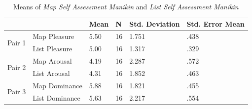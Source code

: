\begin{table}[hbtp!]
\centering
\caption{Means of \textit{Map Self Assessment Manikin} and \textit{List Self Assessment Manikin}} \vspace{0.3cm}
\label{res:sampre}
\begin{tabular}{|l|l|llll|}
\hline
\multicolumn{2}{|c|}{}  & Mean  & N  & Std. Deviation & Std. Error Mean \\ \hline\hline
\multirow{2}{*}{Pair 1} & Map Pleasure  & 5.50 & 16 & 1.751 & .438 \\ \cline{2-6}
                        & List Pleasure & 5.00 & 16 & 1.317 & .329 \\ \hline
\multirow{2}{*}{Pair 2} & Map Arousal  & 4.19 & 16 & 2.287 & .572 \\ \cline{2-6}
                        & List Arousal & 4.31 & 16 & 1.852 & .463 \\ \hline
\multirow{2}{*}{Pair 3} & Map Dominance  & 5.88 & 16 & 1.821 & .455 \\ \cline{2-6}
                        & List Dominance & 5.63 & 16 & 2.217 & .554  \\
\hline          
\end{tabular}
\end{table}

\clearpage

